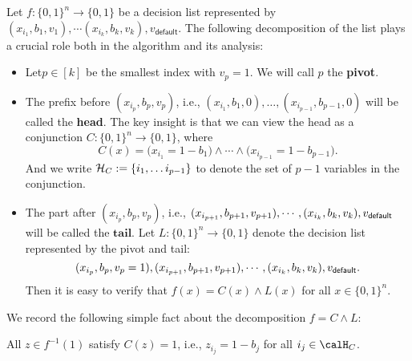 \documentclass[11pt]{article}
\theoremstyle{definition}
\begin{document}
 


Let $f:\{0,1\}^n\rightarrow \{0,1\}$ be a decision list
  represented by $(x_{i_1}, b_1,v_1),\cdots (x_{i_k}, b_k,v_k), v_{\textsf{default}}$.
The following decomposition of the list plays a crucial role both in the algorithm and its analysis:
\begin{flushleft}\begin{itemize}
    \item Let$p\in [k]$ be the smallest index with $v_p = 1$. We will call $p$ the \textbf{pivot}. 
    \item The prefix before $(x_{i_p},b_p,v_{p})$, i.e., $(x_{i_1}, b_1, 0), \ldots, (x_{i_{p-1}}, b_{p-1}, 0)$ will be called the \textbf{head}. The key insight is that we can view the head as a conjunction $C:\{0,1\}^n\rightarrow \{0,1\}$, where $$C(x)= \big(x_{i_1}=1-b_1\big) \land \cdots \land \big(x_{i_{p-1}} = 1-b_{p-1}\big).$$ 
    And we write ${\cal H}_C:=\{{i_1}, \ldots {i_{p-1}}\}$ to denote the set of $p-1$
     variables in the conjunction.
\item The part after $(x_{i_p},b_p,v_p)$, i.e., $(x_{i_{p+1}}, b_{p+1}, v_{p+1}),\cdots,(x_{i_k},b_k,v_k), v_{\mathsf{default}}$ will be called the $\textbf{tail}$.
Let $L:\{0,1\}^n\rightarrow \{0,1\}$ denote
  the decision list represented by the pivot and tail:
 $$(x_{i_p}, b_p,v_p=1),(x_{i_{p+1}}, b_{p+1},v_{p+1}), \cdots,(x_{i_k},b_k,v_k), v_{\mathsf{default}}.$$
Then it is easy to verify that $f(x)=C(x)\land L(x)$ for all $x\in \{0,1\}^n$.
\end{itemize}\end{flushleft}

We record the following simple fact  
  about the decomposition $f=C\land L$:

\begin{observation}\label{ob:simple1}
All $z\in f^{-1}(1)$ satisfy $C(z)=1$, i.e.,
  $z_{i_j}=1-b_j$ for all $i_j\in \calH_C$.
\end{observation}
\end{document}
